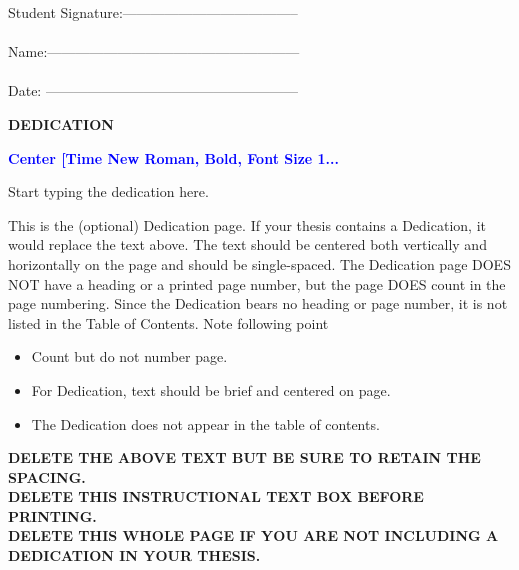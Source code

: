 \documentclass[a4paper,12pt,one side]{report}
\theoremstyle{definition}
\begin{document}
\begin{flushright}
Student Signature:--------------------------------------\\~\\
Name:------------------------------------------------------ \\~\\					
Date: ------------------------------------------------------ \\			\end{flushright}
\NoBgThispage  
  \newpage
	\thispagestyle{empty}
\begin{center}
\textbf {DEDICATION}
\end{center}
\begin{center}
{{\small
  \bfseries \textcolor{blue}{Center [Time New Roman, Bold, Font Size 1...}
}
}\\
\end{center}
Start typing the dedication here.
\vspace{2cm}

\begin{tcolorbox}[enhanced jigsaw,
    sharp corners,
    boxrule=0.5pt, 
    colback=blue!30!white,   
    borderline={0.5pt}{-2pt}{black,solid} %
 ]
 \begin{justify}
     
 
This is the (optional) Dedication page. If your thesis contains a Dedication, it would replace the text above. The text should be centered both vertically and horizontally on the page and should be single-spaced. The Dedication page DOES NOT have a heading or a printed page number, but the page DOES count in the page numbering. Since the Dedication bears no heading or page number, it is not listed in the Table of Contents.
Note following point
\begin{itemize}
\item Count but do not number page.
\item For Dedication, text should be brief and centered on page.
\item The Dedication does not appear in the table of contents.
\end{itemize}
\textbf {DELETE THE ABOVE TEXT BUT BE SURE TO RETAIN THE SPACING.\\
DELETE THIS INSTRUCTIONAL TEXT BOX BEFORE PRINTING.\\
DELETE THIS WHOLE PAGE IF YOU ARE NOT INCLUDING A DEDICATION IN YOUR THESIS.}
\end{justify}
\end{tcolorbox}
\end{document}
